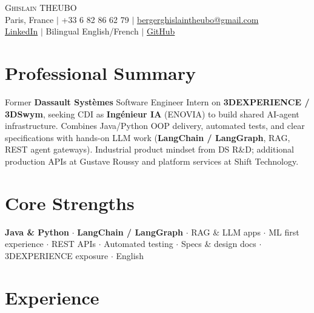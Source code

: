 \documentclass[letterpaper,10.5pt]{article}
\begin{document}
\begin{center}
    {\Huge \scshape Ghislain THEUBO} \\ \vspace{2pt}
    \small Paris, France $|$ +33 6 82 86 62 79 $|$ \href{mailto:bergerghislaintheubo@gmail.com}{bergerghislaintheubo@gmail.com} \\
    \href{https://www.linkedin.com/in/berger-ghislain}{LinkedIn} $|$ Bilingual English/French $|$ \href{https://github.com/Bergerghislain}{GitHub}
\end{center}

\vspace{-6pt}

\section{Professional Summary}
\small{
Former \textbf{Dassault Syst\`emes} Software Engineer Intern on \textbf{3DEXPERIENCE / 3DSwym}, seeking CDI as \textbf{Ing\'enieur IA} (ENOVIA) to build shared AI-agent infrastructure. Combines Java/Python OOP delivery, automated tests, and clear specifications with hands-on LLM work (\textbf{LangChain / LangGraph}, RAG, REST agent gateways). Industrial product mindset from DS R\&D; additional production APIs at Gustave Roussy and platform services at Shift Technology.
}

\section{Core Strengths}
\small{
\textbf{Java \& Python} $\cdot$ \textbf{LangChain / LangGraph} $\cdot$ RAG \& LLM apps $\cdot$ ML first experience $\cdot$ REST APIs $\cdot$ Automated testing $\cdot$ Specs \& design docs $\cdot$ 3DEXPERIENCE exposure $\cdot$ English
}

\section{Experience}
\end{document}
